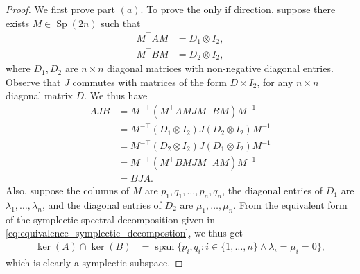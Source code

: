 \documentclass[preprint,12pt]{elsarticle}
\begin{document}
    \begin{proof}    
        We first prove part $(a)$.
        To prove the only if direction, suppose there exists $M \in \operatorname{Sp}(2n)$ such that
        \begin{align}
            M^\top A M &=  D_1 \otimes I_2, \label{eq:diagonal_form} \\
            M^\top B M &=  D_2 \otimes I_2,
        \end{align}
        where $D_1, D_2$ are $n \times n$ diagonal matrices with non-negative diagonal entries.
        Observe that $J$ commutes with matrices of the form $D \times I_2$, for any $n \times n$ diagonal matrix $D$.
        We thus have
        \begin{align}
            AJB &= M^{-\top} \left( M^\top A M J M^\top B M \right) M^{-1}\\
                &= M^{-\top} \left( D_1 \otimes I_2 \right) J \left(D_2 \otimes I_2 \right) M^{-1}\\
                &= M^{-\top} \left( D_2 \otimes I_2 \right) J \left(D_1 \otimes I_2 \right) M^{-1}\\
                &= M^{-\top} \left( M^\top B M J M^\top A M \right) M^{-1}\\
                &= BJA.
        \end{align}
        Also, suppose the columns of $M$ are $p_1, q_1,\ldots, p_n, q_n$, the diagonal entries of $D_1$ are $\lambda_1,\ldots, \lambda_n$, and the diagonal entries of $D_2$ are $\mu_1,\ldots, \mu_n$. 
        From the equivalent form of the symplectic spectral decomposition given in \eqref{eq:equivalence_symplectic_decompostion}, we thus get
    \begin{align}
        \operatorname{ker}(A) \cap \operatorname{ker}(B) 
            &= \operatorname{span}\{p_i, q_i: i \in \{1,\ldots, n\} \wedge \lambda_i=\mu_i=0\},
    \end{align}
    which is clearly a symplectic subspace.
    

\end{proof}
\end{document}
